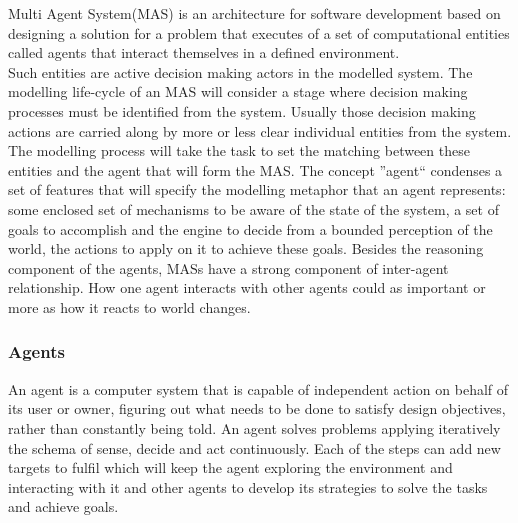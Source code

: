 \documentclass[11pt,oneside,a4paper,openright]{report}
\begin{document}
Multi Agent System(MAS) is an architecture for software development based on designing a solution for a problem that 
executes of a set of computational entities called agents that interact themselves in a defined environment\cite[chapter.1]{Wooldridge2002}.\\
Such entities are active decision making actors in the modelled system. The modelling life-cycle of an MAS will consider a stage where decision making processes must be identified from the system. Usually those decision making actions are carried along by more or less clear individual entities from the system. The modelling process will take the task to set the matching between these entities and the agent that will form the MAS. The concept ''agent`` condenses a set of features that will specify the modelling metaphor that an agent represents:
some enclosed set of mechanisms to be aware of the state of the system, a set of goals to accomplish and the engine to decide from a bounded perception of the world, the actions to apply on it to achieve these goals. Besides the reasoning component of the agents, MASs have a strong component of inter-agent relationship. How one agent interacts with other agents could as important or more as how it reacts to world changes.


\subsubsection{Agents}




An agent is a computer system that is capable of independent action on behalf of its user or owner,
figuring out what needs to be done to satisfy design objectives, rather than constantly being told.\cite[ch.1]{Wooldridge2002} An agent solves problems applying iteratively the schema of sense, decide and 
act continuously. Each of the steps can add new targets to fulfil which will keep the agent exploring 
the environment and interacting with it and other agents to develop its strategies to solve the tasks 
and achieve goals.\\
\end{document}
